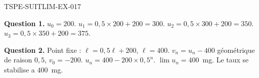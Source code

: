 \begin{corrige}{TSPE-SUITLIM-EX-017}

\textbf{Question 1.} $u_0 = 200$. $u_1 = 0{,}5 \times 200 + 200 = 300$. $u_2 = 0{,}5 \times 300 + 200 = 350$. $u_3 = 0{,}5 \times 350 + 200 = 375$.

\textbf{Question 2.} Point fixe : $\ell = 0{,}5\ell + 200$, $\ell = 400$. $v_n = u_n - 400$ géométrique de raison $0{,}5$, $v_0 = -200$. $u_n = 400 - 200 \times 0{,}5^n$. $\lim u_n = \boxed{400}$~mg. Le taux se stabilise a $400$~mg.

\end{corrige}
